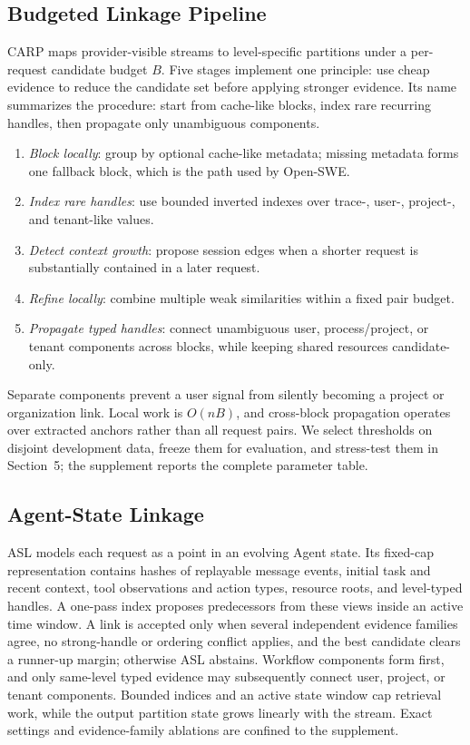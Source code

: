 \documentclass[letterpaper]{article} %
\newcommand{\carp}{\textsc{CARP}\xspace}
\newcommand{\asl}{\textsc{ASL}\xspace}
\begin{document}
\subsection{Budgeted Linkage Pipeline}

\carp maps provider-visible streams to level-specific partitions under a per-request candidate
budget $B$. Five stages implement one principle: use cheap evidence to reduce the candidate set
before applying stronger evidence. Its name summarizes the
procedure: start from cache-like blocks, index rare recurring handles, then propagate only
unambiguous components.
\begin{enumerate}
    \item \emph{Block locally}: group by optional cache-like metadata; missing metadata forms one
    fallback block, which is the path used by Open-SWE.
    \item \emph{Index rare handles}: use bounded inverted indexes over trace-, user-, project-, and
    tenant-like values.
    \item \emph{Detect context growth}: propose session edges when a shorter request is substantially
    contained in a later request.
    \item \emph{Refine locally}: combine multiple weak similarities within a fixed pair budget.
    \item \emph{Propagate typed handles}: connect unambiguous user, process/project, or tenant
    components across blocks, while keeping shared resources candidate-only.
\end{enumerate}
Separate components prevent a user signal from silently becoming a project or organization link.
Local work is $O(nB)$, and cross-block propagation operates over extracted anchors rather than all
request pairs. We select thresholds on disjoint development data, freeze them for evaluation, and
stress-test them in Section~5; the supplement reports the complete parameter table.

\subsection{Agent-State Linkage}

\asl models each request as a point in an evolving Agent state. Its fixed-cap representation contains
hashes of replayable message events,
initial task and recent context, tool observations and action types, resource roots, and level-typed
handles. A one-pass index proposes predecessors from
these views inside an active time window. A link is accepted only when several independent evidence
families agree, no strong-handle or ordering conflict applies, and the best candidate clears a
runner-up margin; otherwise \asl abstains. Workflow components form first, and only same-level typed
evidence may subsequently connect user, project, or tenant components. Bounded indices and an active
state window cap retrieval work, while the output partition state grows linearly with the stream.
Exact settings and evidence-family ablations are confined to the supplement.
\end{document}
